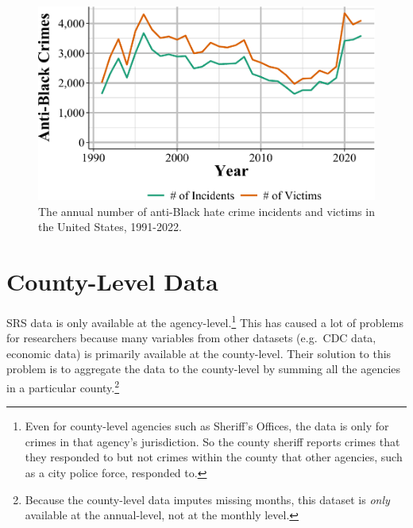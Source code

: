 \documentclass[
  12pt,
  openany]{book}
\begin{document}
\begin{figure}

{\centering \includegraphics[width=0.9\linewidth]{09_hate_crime_files/figure-latex/blackIncidentVictim-1} 

}

\caption{The annual number of anti-Black hate crime incidents and victims in the United States, 1991-2022.}\label{fig:blackIncidentVictim}
\end{figure}

\chapter{County-Level Data}\label{county-level-data}

SRS data is only available at the agency-level.\footnote{Even for county-level agencies such as Sheriff's Offices, the data is only for crimes in that agency's jurisdiction. So the county sheriff reports crimes that they responded to but not crimes within the county that other agencies, such as a city police force, responded to.} This has caused a lot of problems for researchers because many variables from other datasets (e.g.~CDC data, economic data) is primarily available at the county-level. Their solution to this problem is to aggregate the data to the county-level by summing all the agencies in a particular county.\footnote{Because the county-level data imputes missing months, this dataset is \emph{only} available at the annual-level, not at the monthly level.}
\end{document}
